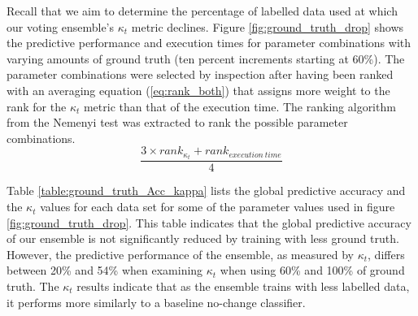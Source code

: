 \documentclass[runningheads]{llncs}
\begin{document}
Recall that we aim to determine the percentage of labelled data used at which our voting ensemble's $\kappa_t$ metric declines. Figure \ref{fig:ground_truth_drop} shows the predictive performance and execution times for parameter combinations with varying amounts of ground truth (ten percent increments starting at 60\%). The parameter combinations were selected by inspection after having been ranked with an averaging equation (\ref{eq:rank_both}) that assigns more weight to the rank for the $\kappa_t$ metric than that of the execution time. The ranking algorithm from the Nemenyi test was extracted to rank the possible parameter combinations.
\begin{equation}
\label{eq:rank_both}
\frac{3\times rank_{\kappa_t}+rank_{execution\ time}}{4}
\end{equation}

Table \ref{table:ground_truth_Acc_kappa} lists the global predictive accuracy and the $\kappa_t$ values for each data set for some of the parameter values used in figure \ref{fig:ground_truth_drop}. This table indicates that the global predictive accuracy of our ensemble is not significantly reduced by training with less ground truth. However, the predictive performance of the ensemble, as measured by $\kappa_t$, differs between 20\% and 54\% when examining $\kappa_t$ when using 60\% and 100\% of ground truth. The $\kappa_t$ results indicate that as the ensemble trains with less labelled data, it performs more similarly to a baseline no-change classifier.
\end{document}
